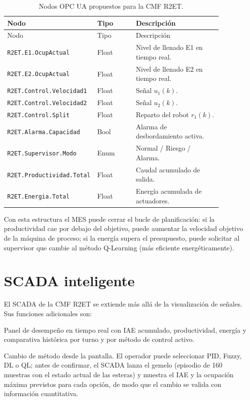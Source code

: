 \begin{longtable}{@{}P{0.30\linewidth}P{0.18\linewidth}P{0.40\linewidth}@{}}
\caption{Nodos OPC UA propuestos para la CMF R2ET.}
\label{tab:opcua}\\
\toprule
Nodo & Tipo & Descripción \\ \midrule \endfirsthead
\toprule Nodo & Tipo & Descripción \\ \midrule \endhead
\texttt{R2ET.E1.OcupActual} & Float & Nivel de llenado E1 en tiempo real.\\
\texttt{R2ET.E2.OcupActual} & Float & Nivel de llenado E2 en tiempo real.\\
\texttt{R2ET.Control.Velocidad1} & Float & Señal $u_1(k)$.\\
\texttt{R2ET.Control.Velocidad2} & Float & Señal $u_2(k)$.\\
\texttt{R2ET.Control.Split} & Float & Reparto del robot $r_1(k)$.\\
\texttt{R2ET.Alarma.Capacidad} & Bool & Alarma de desbordamiento activa.\\
\texttt{R2ET.Supervisor.Modo} & Enum & Normal / Riesgo / Alarma.\\
\texttt{R2ET.Productividad.Total} & Float & Caudal acumulado de salida.\\
\texttt{R2ET.Energia.Total} & Float & Energía acumulada de actuadores.\\
\bottomrule
\end{longtable}

Con esta estructura el MES puede cerrar el bucle de planificación: si la productividad cae por debajo del objetivo, puede aumentar la velocidad objetivo de la máquina de proceso; si la energía supera el presupuesto, puede solicitar al supervisor que cambie al método Q-Learning (más eficiente energéticamente).

\section{SCADA inteligente}

El SCADA de la CMF R2ET se extiende más allá de la visualización de señales. Sus funciones adicionales son:

Panel de desempeño en tiempo real con IAE acumulado, productividad, energía y comparativa histórica por turno y por método de control activo.

Cambio de método desde la pantalla. El operador puede seleccionar PID, Fuzzy, DL o QL; antes de confirmar, el SCADA lanza el gemelo (episodio de 160 muestras con el estado actual de las esteras) y muestra el IAE y la ocupación máxima previstos para cada opción, de modo que el cambio se valida con información cuantitativa.

